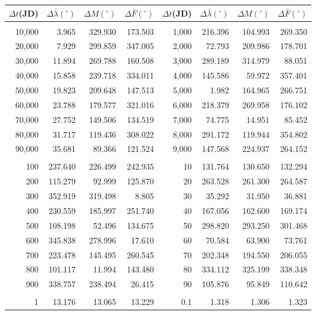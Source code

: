 \clearpage
\begin{table}
\centering
\begin{tabular}{rrrr|rrrr}
$\Delta t$(JD)& $\Delta\bar{\lambda}(^\circ)$ &  $\Delta M(^\circ)$ & $\Delta \bar{F}(^\circ)$& $\Delta t$(JD) & $\Delta\bar{\lambda}(^\circ)$ & $\Delta M(^\circ)$ 
&$\Delta \bar{F}(^\circ)$\\ \hline
&&&&&&&\\[-1.75ex]
10,000 &   3.965 & 329.930 & 173.503 & 1,000 & 216.396 & 104.993 & 269.350\\
20,000 &   7.929 & 299.859 & 347.005 & 2,000 &  72.793 & 209.986 & 178.701\\
30,000 &  11.894 & 269.788 & 160.508 & 3,000 & 289.189 & 314.979 &  88.051\\
40,000 &  15.858 & 239.718 & 334.011 & 4,000 & 145.586 &  59.972 & 357.401\\
50,000 &  19.823 & 209.648 & 147.513 & 5,000 &   1.982 & 164.965 & 266.751\\
60,000 &  23.788 & 179.577 & 321.016 & 6,000 & 218.379 & 269.958 & 176.102\\
70,000 &  27.752 & 149.506 & 134.519 & 7,000 &  74.775 &  14.951 &  85.452\\
80,000 &  31.717 & 119.436 & 308.022 & 8,000 & 291.172 & 119.944 & 354.802\\
90,000 &  35.681 &  89.366 & 121.524 & 9,000 & 147.568 & 224.937 & 264.152\\
&&&&&&&\\
100 & 237.640 & 226.499 & 242.935 & 10 & 131.764 & 130.650 & 132.294\\
200 & 115.279 &  92.999 & 125.870 & 20 & 263.528 & 261.300 & 264.587\\
300 & 352.919 & 319.498 &   8.805 & 30 &  35.292 &  31.950 &  36.881\\
400 & 230.559 & 185.997 & 251.740 & 40 & 167.056 & 162.600 & 169.174\\
500 & 108.198 &  52.496 & 134.675 & 50 & 298.820 & 293.250 & 301.468\\
600 & 345.838 & 278.996 &  17.610 & 60 &  70.584 &  63.900 &  73.761\\
700 & 223.478 & 145.495 & 260.545 & 70 & 202.348 & 194.550 & 206.055\\
800 & 101.117 &  11.994 & 143.480 & 80 & 334.112 & 325.199 & 338.348\\
900 & 338.757 & 238.494 &  26.415 & 90 & 105.876 &  95.849 & 110.642\\
&&&&&&&\\
1 &  13.176 &  13.065 &  13.229 & 0.1 &   1.318 &   1.306 &   1.323\\

\end{tabular}
\end{table}
